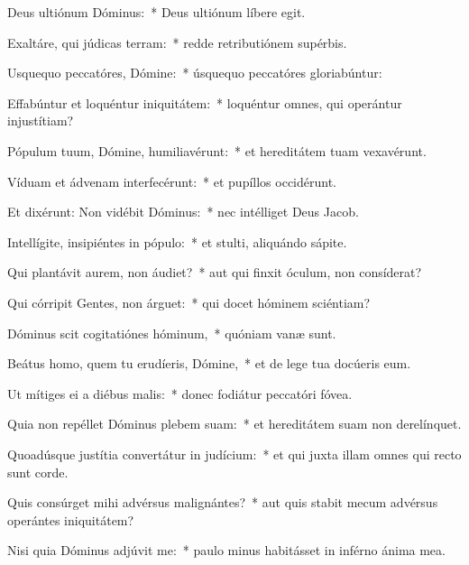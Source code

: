 \item Deus ultiónum Dóminus:~* Deus ultiónum líbere egit.

\item Exaltáre, qui júdicas terram:~* redde retributiónem supérbis.

\item Usquequo peccatóres, Dómine:~* úsquequo peccatóres gloriabúntur:

\item Effabúntur et loquéntur iniquitátem:~* loquéntur omnes, qui operántur injustítiam?

\item Pópulum tuum, Dómine, humiliavérunt:~* et hereditátem tuam vexavérunt.

\item Víduam et ádvenam interfecérunt:~* et pupíllos occidérunt.

\item Et dixérunt: Non vidébit Dóminus:~* nec intélliget Deus Jacob.

\item Intellígite, insipiéntes in pópulo:~* et stulti, aliquándo sápite.

\item Qui plantávit aurem, non áudiet?~* aut qui finxit óculum, non consíderat?

\item Qui córripit Gentes, non árguet:~* qui docet hóminem sciéntiam?

\item Dóminus scit cogitatiónes hóminum,~* quóniam vanæ sunt.

\item Beátus homo, quem tu erudíeris, Dómine,~* et de lege tua docúeris eum.

\item Ut mítiges ei a diébus malis:~* donec fodiátur peccatóri fóvea.

\item Quia non repéllet Dóminus plebem suam:~* et hereditátem suam non derelínquet.

\item Quoadúsque justítia convertátur in judícium:~* et qui juxta illam omnes qui recto sunt corde.

\item Quis consúrget mihi advérsus malignántes?~* aut quis stabit mecum advérsus operántes iniquitátem?

\item Nisi quia Dóminus adjúvit me:~* paulo minus habitásset in inférno ánima mea.

